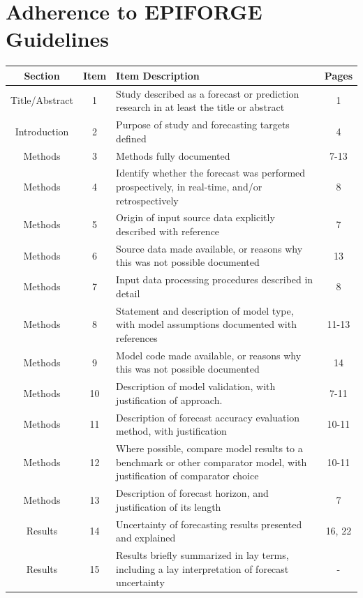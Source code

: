 \documentclass{article}
\begin{document}
\newpage

\section{Adherence to EPIFORGE Guidelines}

\begin{longtable}{c  c  p{6cm}  c}
\toprule
Section & Item & Item Description & Pages \\
\midrule
\endhead
Title/Abstract & 1 & Study described as a forecast or prediction research in at least the title or abstract & 1 \\
\midrule
Introduction & 2 & Purpose of study and forecasting targets defined & 4 \\
\midrule
Methods & 3 & Methods fully documented & 7-13 \\
\midrule
Methods & 4 & Identify whether the forecast was performed prospectively, in real-time, and/or retrospectively & 8 \\
\midrule
Methods & 5 & Origin of input source data explicitly described with reference & 7 \\
\midrule
Methods & 6 & Source data made available, or reasons why this was not possible documented & 13 \\
\midrule
Methods & 7 & Input data processing procedures described in detail & 8 \\
\midrule
Methods & 8 & Statement and description of model type, with model assumptions documented with references & 11-13 \\
\midrule
Methods & 9 & Model code made available, or reasons why this was not possible documented & 14 \\
\midrule
Methods & 10 & Description of model validation, with justification of approach. & 7-11 \\
\midrule
Methods & 11 & Description of forecast accuracy evaluation method, with justification & 10-11 \\
\midrule
Methods & 12 & Where possible, compare model results to a benchmark or other comparator model, with justification of comparator choice & 10-11 \\
\midrule
Methods & 13 & Description of forecast horizon, and justification of its length & 7 \\
\midrule
Results & 14 & Uncertainty of forecasting results presented and explained & 16, 22 \\
\midrule
Results & 15 & Results briefly summarized in lay terms, including a lay interpretation of forecast uncertainty & - \\

\end{longtable}
\end{document}
